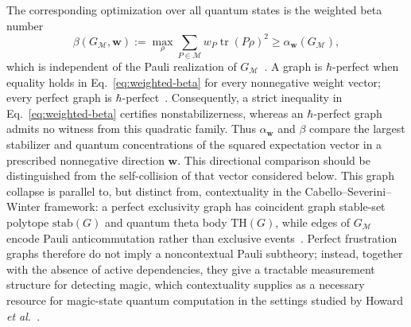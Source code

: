 \documentclass[10pt,aps,pra,twocolumn,floatfix,nofootinbib,superscriptaddress,longbibliography]{revtex4-2}
\newcommand{\Mcal}{\mathcal M}
\newcommand{\stab}{\mathrm{stab}}
\renewcommand{\tr}{\operatorname{tr}}
\providecommand{\mathbm}[1]{\bm{#1}}
\begin{document}
\begin{bibunit}[apsrev4-2]
		The corresponding optimization over all quantum states is the weighted beta number
		\begin{equation}
			\beta(G_\Mcal,\mathbm{w}):=\max_\rho\sum_{P\in\Mcal}w_P\tr(P\rho)^2\ge\alpha_{\mathbm{w}}(G_\Mcal),
			\label{eq:weighted-beta}
		\end{equation}
		which is independent of the Pauli realization of $G_\Mcal$~\cite{xu2024bounding,xu2025simultaneous}.
		A graph is $\hbar$-perfect when equality holds in Eq.~\eqref{eq:weighted-beta} for every nonnegative weight vector; every perfect graph is $\hbar$-perfect~\cite{xu2025simultaneous}.
		Consequently, a strict inequality in Eq.~\eqref{eq:weighted-beta} certifies nonstabilizerness, whereas an $\hbar$-perfect graph admits no witness from this quadratic family.
		Thus $\alpha_{\mathbm{w}}$ and $\beta$ compare the largest stabilizer and quantum concentrations of the squared expectation vector in a prescribed nonnegative direction $\mathbm{w}$. This directional comparison should be distinguished from the self-collision of that vector considered below.
		This graph collapse is parallel to, but distinct from, contextuality in the Cabello--Severini--Winter framework: a perfect exclusivity graph has coincident graph stable-set polytope $\stab(G)$ and quantum theta body $\mathrm{TH}(G)$, while edges of $G_\Mcal$ encode Pauli anticommutation rather than exclusive events~\cite{cabello2014graph}.
		Perfect frustration graphs therefore do not imply a noncontextual Pauli subtheory; instead, together with the absence of active dependencies, they give a tractable measurement structure for detecting magic, which contextuality supplies as a necessary resource for magic-state quantum computation in the settings studied by Howard \emph{et al.}~\cite{howard2014contextuality}.
		

\end{bibunit}
\end{document}
